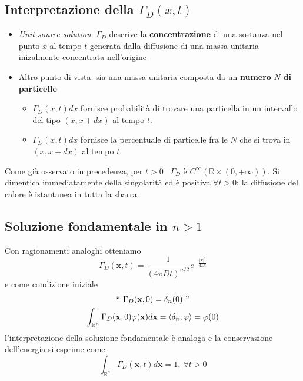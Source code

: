 \documentclass[10pt,a4paper,twoside,openright]{book}
\begin{document}
\subsection{Interpretazione della \texorpdfstring{$\displaystyle \Gamma _{D}(x,t)$}{soluzione}}
\begin{itemize}
\item \textit{Unit source solution}: $\displaystyle \Gamma _{D}$ descrive la \textbf{concentrazione} di una sostanza nel punto $\displaystyle x$ al tempo $\displaystyle t$ generata dalla diffusione di una massa unitaria inizalmente concentrata nell'origine
\item Altro punto di vista: sia una massa unitaria composta da un \textbf{numero }$\displaystyle N$\textbf{ di particelle}
\begin{itemize}
\item $\displaystyle \Gamma _{D}(x,t) dx$ fornisce probabilità di trovare una particella in un intervallo del tipo $\displaystyle (x,x+dx)$ al tempo $\displaystyle t$.
\item $\displaystyle \Gamma _{D}(x,t) dx$ fornisce la percentuale di particelle fra le $\displaystyle N$ che si trova in $\displaystyle (x,x+dx)$ al tempo $\displaystyle t$.
\end{itemize}
\end{itemize}
\begin{nb}
Come già osservato in precedenza, per $\displaystyle t >0$ \ $\displaystyle \Gamma _{D}$ è $\displaystyle C^{\infty }(\mathbb{R} \times (0,+\infty))$. Si dimentica immediatamente della singolarità ed è positiva $\displaystyle \forall t >0$: la diffusione del calore è istantanea in tutta la sbarra.
\end{nb}
\subsection{Soluzione fondamentale in \texorpdfstring{$n>1$}{n>1}}

Con ragionamenti analoghi otteniamo
\begin{equation*}
\Gamma _{D}(\mathbf{x},t) =\frac{1}{(4\pi Dt)^{n/2}} e^{-\frac{| \mathbf{x}| ^{2}}{4Dt}}
\end{equation*}
e come condizione iniziale
\begin{gather*}
``\ \Gamma _{D}(\mathbf{x},0) =\delta _{n}(0) \ "\\
\int _{\mathbb{R}^{n}} \Gamma _{D}(\mathbf{x},0) \varphi (\mathbf{x}) d\mathbf{x} =\langle \delta _{n},\varphi \rangle =\varphi (0)
\end{gather*}
l'interpretazione della soluzione fondamentale è analoga e la conservazione dell'energia si esprime come\begin{equation*}
\int _{\mathbb{R}^{n}} \Gamma _{D}(\mathbf{x},t) d\mathbf{x} =1,\ \forall t >0
\end{equation*}
\end{document}
